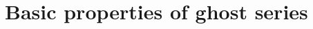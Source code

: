 \documentclass[12pt]{amsart}
\theoremstyle{definition}
\newtheorem{notation}[subsection]{Notation}
\numberwithin{equation}{subsection}
\def\rmH{\mathrm{H}}
\def\rmS{\mathrm{S}}
\newcommand{\Iw}{\mathrm{Iw}}
\newcommand{\unr}{\mathrm{ur}}
\begin{document}






\section{Basic properties of ghost series}
\label{Sec:properties of ghost series}
\end{document}
